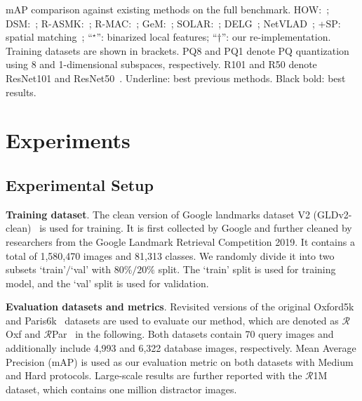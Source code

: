 \documentclass[letterpaper]{article} \usepackage{aaai22}  \usepackage{times}  \usepackage{helvet}  \usepackage{courier}  \usepackage[hyphens]{url}  \usepackage{graphicx} \urlstyle{rm} \def\UrlFont{\rm}  \usepackage{natbib}  \usepackage{caption} \DeclareCaptionStyle{ruled}{labelfont=normalfont,labelsep=colon,strut=off} \frenchspacing  \setlength{\pdfpagewidth}{8.5in}  \setlength{\pdfpageheight}{11in}  \usepackage{algorithm}
\begin{document}
\begin{table*}[h]
	\caption{mAP comparison against existing methods on the full benchmark. HOW:~\cite{tolias2020learning}; DSM:~\cite{Simeoni_2019_CVPR}; R-ASMK:~\cite{teichmann2019detect}; R-MAC:~\cite{tolias:hal-01842218}; GeM:~\cite{radenovic2018fine}; SOLAR:~\cite{ng2020solar}; DELG~\cite{cao2020unifying}; NetVLAD~\cite{arandjelovic2016netvlad}; +SP: spatial matching~\cite{philbin2007object}; 
		``$^\star$'': binarized local features; ``$\dagger$'': our re-implementation. 
		Training datasets are shown in brackets. PQ8 and PQ1 denote PQ quantization using 8 and 1-dimensional subspaces, respectively. R101 and R50 denote ResNet101 and ResNet50~\cite{He_2016_CVPR}.
		Underline: best previous methods. 
		Black bold: best results.}
	\label{tab:state-of-the-art}
\end{table*}

\section{Experiments} \label{sec:experiments}
\subsection{Experimental Setup}
\noindent\textbf{Training dataset}. 
The clean version of Google landmarks dataset V2 (GLDv2-clean)~\cite{weyand2020google} is used for training. 
It is first collected by Google and further cleaned by researchers from the Google Landmark Retrieval Competition 2019. 
It contains a total of 1,580,470 images and 81,313 classes. 
We randomly divide it into two subsets `train’$/$`val’ with $80\%/20\%$ split.
The `train’ split is used for training model, and the `val’ split is used for validation.

\noindent\textbf{Evaluation datasets and metrics}. 
Revisited versions of the original Oxford5k~\cite{philbin2007object} and Paris6k~\cite{philbin2008lost} datasets are used to evaluate our method, which are denoted as $\mathcal{R}$Oxf and $\mathcal{R}$Par~\cite{radenovic2018revisiting} in the following. 
Both datasets contain 70 query images and additionally include 4,993 and 6,322 database images, respectively.
Mean Average Precision (mAP) is used as our evaluation metric on both datasets with Medium and Hard protocols.
Large-scale results are further reported with the $\mathcal{R}$1M dataset, which contains one million distractor images.
\end{document}
